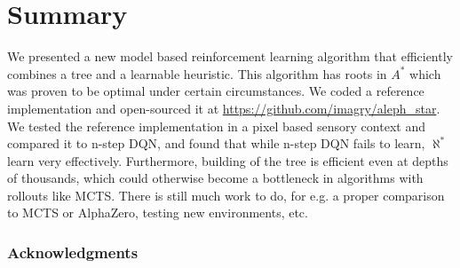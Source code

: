 \documentclass{article}
\newcommand{\alephstar}{$\aleph^*$ }
\newcommand{\astar}{$A^*$ }
\begin{document}
\section{Summary}
\label{sec:summary}

We presented a new model based reinforcement learning algorithm that efficiently combines a tree and a learnable heuristic. This algorithm has roots in \astar which was proven to be optimal under certain circumstances. We coded a reference implementation and open-sourced it at \url{https://github.com/imagry/aleph_star}. We tested the reference implementation in a pixel based sensory context and compared it to n-step DQN, and found that while n-step DQN fails to learn, \alephstar learn very effectively. Furthermore, building of the tree is efficient even at depths of thousands, which could otherwise become a bottleneck in algorithms with rollouts like MCTS. There is still much work to do, for e.g. a proper comparison to MCTS or AlphaZero, testing new environments, etc.

\subsubsection*{Acknowledgments}




{

\small

}
\end{document}
